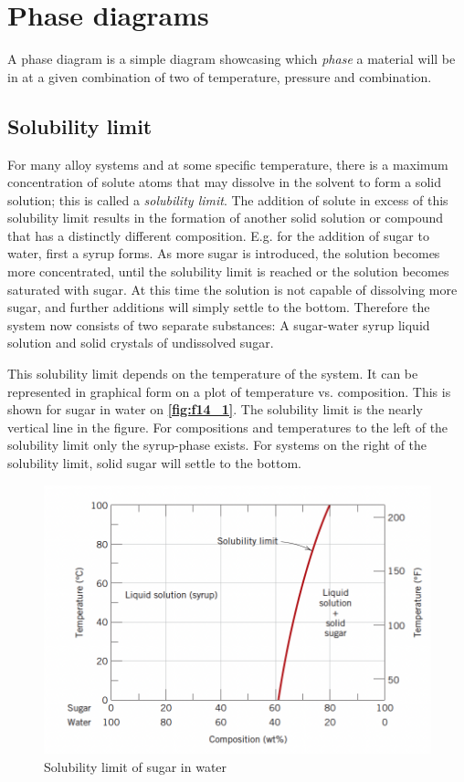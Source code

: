
\section{Phase diagrams}
A phase diagram is a simple diagram showcasing which \textit{phase} a material will be in at a given combination of two of temperature, pressure and combination. 

\subsection{Solubility limit}
For many alloy systems and at some specific temperature, there is a maximum concentration of solute atoms that may dissolve in the solvent to form a solid solution; this is called a \textit{solubility limit}. The addition of solute in excess of this solubility limit results in the formation of another solid solution or compound that has a distinctly different composition. E.g. for the addition of sugar to water, first a syrup forms. As more sugar is introduced, the solution becomes more concentrated, until the solubility limit is reached or the solution becomes saturated with sugar. At this time the solution is not capable of dissolving more sugar, and further additions will simply settle to the bottom. Therefore the system now consists of two separate substances: A sugar-water syrup liquid solution and solid crystals of undissolved sugar.

This solubility limit depends on the temperature of the system. It can be represented in graphical form on a plot of temperature vs. composition. This is shown for sugar in water on \textbf{\autoref{fig:f14_1}}. The solubility limit is the nearly vertical line in the figure. For compositions and temperatures to the left of the solubility limit only the syrup-phase exists. For systems on the right of the solubility limit, solid sugar will settle to the bottom. 
\begin{figure} [ht]
  \centering
  \includegraphics[width=0.5\linewidth]{./figures/f14_1.png}
  \caption{Solubility limit of sugar in water}
  \label{fig:f14_1}
\end{figure}

